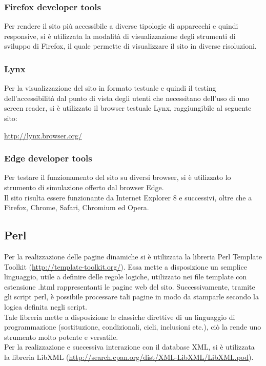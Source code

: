 		\subsubsection{Firefox developer tools}
		Per rendere il sito più accessibile a diverse tipologie di apparecchi e quindi responsive, si è utilizzata la modalità di visualizzazione degli strumenti di sviluppo di Firefox, il quale permette di visualizzare il sito in diverse risoluzioni.
		
		\subsubsection{Lynx}
		Per la visualizzazione del sito in formato testuale e quindi il testing dell'accessibilità dal punto di vista degli utenti che necessitano dell'uso di uno screen reader, si è utilizzato il browser testuale Lynx, raggiungibile al seguente sito:
		\begin{center}
			\url {http://lynx.browser.org/}
		\end{center}
		
		\subsubsection{Edge developer tools}
		Per testare il funzionamento del sito su diversi browser, si è utilizzato lo strumento di simulazione offerto dal browser Edge. \\
		Il sito risulta essere funzionante da Internet Explorer 8 e successivi, oltre che a Firefox, Chrome, Safari, Chromium ed Opera.
	
	\subsection{Perl}
	Per la realizzazione delle pagine dinamiche si è utilizzata la libreria Perl Template Toolkit (\url{http://template-toolkit.org/}). Essa mette a disposizione un semplice linguaggio, utile a definire delle regole logiche, utilizzato nei file template con estensione .html rappresentanti le pagine web del sito. Successivamente, tramite gli script perl, è possibile processare tali pagine in modo da stamparle secondo la logica definita negli script. \\
	Tale libreria mette a disposizione le classiche direttive di un linguaggio di programmazione (sostituzione, condizionali, cicli, inclusioni etc.), ciò la rende uno strumento molto potente e versatile. \\
	Per la realizzazione e successiva interazione con il database XML, si è utilizzata la libreria LibXML (\url{http://search.cpan.org/dist/XML-LibXML/LibXML.pod}).
